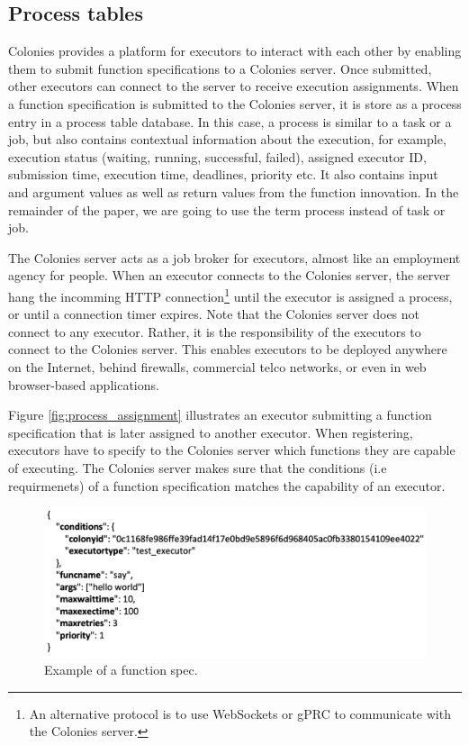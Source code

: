 \documentclass{article}
\begin{document}
\subsection{Process tables}
Colonies provides a platform for executors to interact with each other by enabling them to submit function specifications to a Colonies server. Once submitted, other executors can connect to the server to receive execution assignments. When a function specification is submitted to the Colonies server, it is store as a process entry in a process table database. In this case, a process is similar to a task or a job, but also contains contextual information about the execution, for example, execution status (waiting, running, successful, failed), assigned executor ID, submission time, execution time, deadlines, priority etc. It also contains input and argument values as well as return values from the function innovation. In the remainder of the paper, we are going to use the term process instead of task or job.

The Colonies server acts as a job broker for executors, almost like an employment agency for people. When an executor connects to the Colonies server, the server hang the incomming HTTP connection\footnote{An alternative protocol is to use WebSockets or gPRC to communicate with the Colonies server.} until the executor is assigned a process, or until a connection timer expires. Note that the Colonies server does not connect to any executor. Rather, it is the responsibility of the executors to connect to the Colonies server. This enables executors to be deployed anywhere on the Internet, behind firewalls, commercial telco networks, or even in web browser-based applications.

Figure \ref{fig:process_assignment} illustrates an executor submitting a function specification that is later assigned to another executor. When registering, executors have to specify to the Colonies server which functions they are capable of executing. The Colonies server makes sure that the conditions (i.e requirmenets) of a function specification matches the capability of an executor. 
\begin{figure}[h]
	\centering
    \includegraphics[scale=0.35]{function_spec.png}
	\caption{Example of a function spec.}
	\label{fig:function_spec}
\end{figure}
\end{document}
